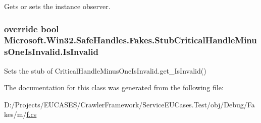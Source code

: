 Gets or sets the instance observer.

\hypertarget{class_microsoft_1_1_win32_1_1_safe_handles_1_1_fakes_1_1_stub_critical_handle_minus_one_is_invalid_afc1630eaeaf55919e7b6cc7faadeba3c}{
\subsubsection[{Is\-Invalid}]{\setlength{\rightskip}{0pt plus 5cm}override bool Microsoft.\-Win32.\-Safe\-Handles.\-Fakes.\-Stub\-Critical\-Handle\-Minus\-One\-Is\-Invalid.\-Is\-Invalid\hspace{0.3cm}{\ttfamily [get]}}}\label{class_microsoft_1_1_win32_1_1_safe_handles_1_1_fakes_1_1_stub_critical_handle_minus_one_is_invalid_afc1630eaeaf55919e7b6cc7faadeba3c}


Sets the stub of Critical\-Handle\-Minus\-One\-Is\-Invalid.\-get\-\_\-\-Is\-Invalid()



The documentation for this class was generated from the following file\-:\begin{DoxyCompactItemize}
\item 
D\-:/\-Projects/\-E\-U\-C\-A\-S\-E\-S/\-Crawler\-Framework/\-Service\-E\-U\-Cases.\-Test/obj/\-Debug/\-Fakes/m/\hyperlink{m_2f_8cs}{f.\-cs}\end{DoxyCompactItemize}

